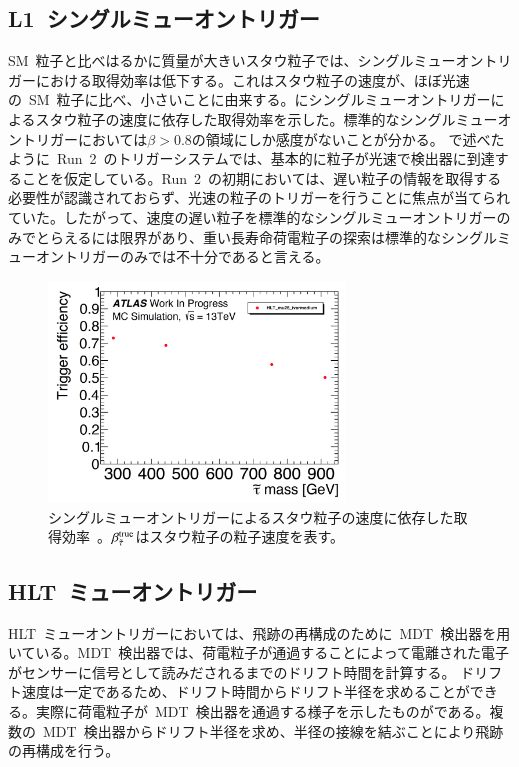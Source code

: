\subsection{L1~シングルミューオントリガー}
SM~粒子と比べはるかに質量が大きいスタウ粒子では、シングルミューオントリガーにおける取得効率は低下する。これはスタウ粒子の速度が、ほぼ光速の~SM~粒子に比べ、小さいことに由来する。にシングルミューオントリガーによるスタウ粒子の速度に依存した取得効率を示した。標準的なシングルミューオントリガーにおいては$\beta>0.8$の領域にしか感度がないことが分かる。
で述べたように~Run~2~のトリガーシステムでは、基本的に粒子が光速で検出器に到達することを仮定している。Run~2~の初期においては、遅い粒子の情報を取得する必要性が認識されておらず、光速の粒子のトリガーを行うことに焦点が当てられていた。したがって、速度の遅い粒子を標準的なシングルミューオントリガーのみでとらえるには限界があり、重い長寿命荷電粒子の探索は標準的なシングルミューオントリガーのみでは不十分であると言える。
\begin{figure}[tbp]
        \centering   
        \includegraphics[width=0.7\textwidth,page=2]{img/pdf3/sumi.pdf}
        \caption[シングルミューオントリガーによるスタウ粒子の速度に依存した取得効率]{シングルミューオントリガーによるスタウ粒子の速度に依存した取得効率~\cite{MT:01}。$\beta_{\Tilde{\tau}}^{\rm{true}}$はスタウ粒子の粒子速度を表す。}
        \label{fig:sumi2}
\end{figure}

\subsection{HLT~ミューオントリガー}
HLT~ミューオントリガーにおいては、飛跡の再構成のために~MDT~検出器を用いている。MDT~検出器では、荷電粒子が通過することによって電離された電子がセンサーに信号として読みだされるまでのドリフト時間を計算する。
ドリフト速度は一定であるため、ドリフト時間からドリフト半径を求めることができる。実際に荷電粒子が~MDT~検出器を通過する様子を示したものがである。複数の~MDT~検出器からドリフト半径を求め、半径の接線を結ぶことにより飛跡の再構成を行う。

